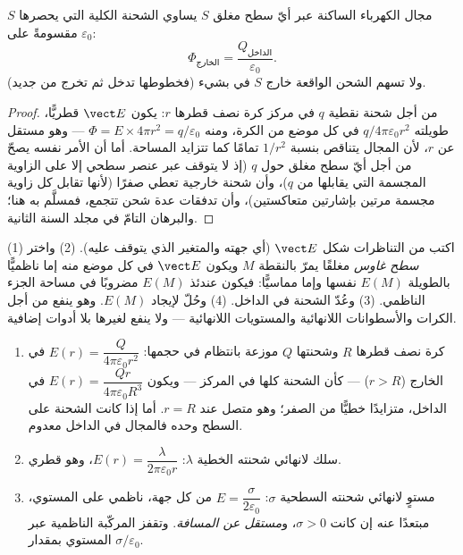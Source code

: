 \begin{theorem}\label{thm:b1:electrostatics-gauss:gauss}
 مجال الكهرباء الساكنة عبر أيّ سطح مغلق $S$
يساوي الشحنة الكلية التي يحصرها $S$ مقسومةً على $\varepsilon_0$:
\[
\Phi_{\text{الخارج}} = \frac{Q_{\text{الداخل}}}{\varepsilon_0} .
\]
ولا تسهم الشحن الواقعة خارج $S$ في  بشيء (فخطوطها تدخل
ثم تخرج من جديد).
\end{theorem}

\begin{proof}
من أجل شحنة نقطية $q$ في مركز كرة نصف قطرها $r$:
يكون $\vect E$ قطريًّا، طويلته $q/4\pi\varepsilon_0r^2$ في كل موضع من
الكرة، ومنه $\Phi = E \times 4\pi r^2 = q/\varepsilon_0$ --- وهو مستقل عن $r$،
لأن المجال يتناقص بنسبة $1/r^2$ تمامًا كما تتزايد المساحة. أما أن
الأمر نفسه يصحّ من أجل أيّ سطح مغلق حول $q$ (إذ لا يتوقف  عبر
عنصر سطحي إلا على الزاوية المجسمة التي يقابلها من $q$)،
وأن شحنة خارجية تعطي صفرًا (لأنها تقابل كل زاوية مجسمة مرتين
بإشارتين متعاكستين)، وأن تدفقات عدة شحن تتجمع، فمسلَّم به
هنا؛ والبرهان التامّ في مجلد السنة الثانية.
\end{proof}

\begin{method}\label{meth:b1:electrostatics-gauss:gauss}
(1) اكتب من التناظرات شكل $\vect E$ (أي جهته والمتغير
الذي يتوقف عليه). (2) واختر \emph{سطح غاوس} مغلقًا
يمرّ بالنقطة $M$ ويكون $\vect E$ في كل موضع منه إما ناظميًّا
بالطويلة $E(M)$ نفسها وإما مماسيًّا: فيكون  عندئذ $E(M)$ مضروبًا في
مساحة الجزء الناظمي. (3) وعُدّ الشحنة في الداخل. (4) وحُلّ لإيجاد
$E(M)$. وهو ينفع من أجل الكرات والأسطوانات اللانهائية والمستويات اللانهائية
--- ولا ينفع لغيرها بلا أدوات إضافية.
\end{method}

\begin{proposition}\label{prop:b1:electrostatics-gauss:three}
\begin{enumerate}
  \item كرة نصف قطرها $R$ وشحنتها $Q$ موزعة بانتظام في
        حجمها: $E(r) = \dfrac{Q}{4\pi\varepsilon_0r^2}$ في الخارج ($r > R$) ---
        كأن الشحنة كلها في المركز --- ويكون $E(r) =
        \dfrac{Qr}{4\pi\varepsilon_0R^3}$ في الداخل، متزايدًا خطيًّا من الصفر؛
        وهو متصل عند $r = R$. أما إذا كانت الشحنة على السطح وحده
        فالمجال في الداخل معدوم.
  \item سلك لانهائي شحنته الخطية $\lambda$: $E(r) =
        \dfrac{\lambda}{2\pi\varepsilon_0 r}$، وهو قطري.
  \item مستوٍ لانهائي شحنته السطحية $\sigma$: $E = \dfrac{\sigma}{2\varepsilon_0}$
        من كل جهة، ناظمي على المستوي، مبتعدًا عنه إن كانت
        $\sigma > 0$، و\emph{مستقل عن المسافة}. وتقفز المركّبة الناظمية
        عبر المستوي بمقدار $\sigma/\varepsilon_0$.
\end{enumerate}
\end{proposition}

